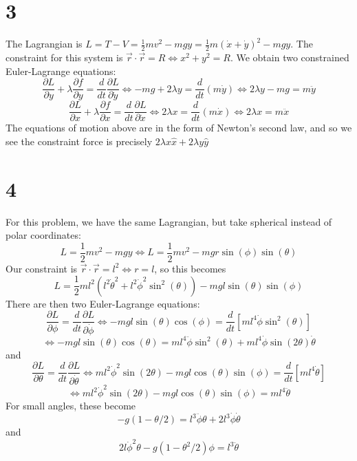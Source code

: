 \documentclass{article}
\begin{document}
\section*{3}
The Lagrangian is $L=T-V=\frac{1}{2}mv^2-mgy=\frac{1}{2}m(\dot{x}+\dot{y})^2-mgy$.
The constraint for this system is $\vec{r}\cdot\vec{r}=R\Leftrightarrow x^2+y^2=R$.
We obtain two constrained Euler-Lagrange equations:
\[\frac{\partial L}{\partial y}+\lambda\frac{\partial f}{\partial y}=\frac{d}{dt}\frac{\partial L}{\partial \dot{y}}\Leftrightarrow -mg+2\lambda y=\frac{d}{dt}(m\dot{y})\Leftrightarrow2\lambda y-mg=m\ddot{y}\]
\[\frac{\partial L}{\partial x}+\lambda\frac{\partial f}{\partial x}=\frac{d}{dt}\frac{\partial L}{\partial \dot{x}}\Leftrightarrow  2\lambda x=\frac{d}{dt}(m\dot{x})\Leftrightarrow2\lambda x=m\ddot{x}\]
The equations of motion above are in the form of Newton's second law, and so we see the constraint force is precisely $2\lambda x\hat{x}+2\lambda y\hat{y}$

\section*{4}
For this problem, we have the same Lagrangian, but take spherical instead of polar coordinates:
\[L=\frac{1}{2}mv^2-mgy \Leftrightarrow L=\frac{1}{2}mv^2-mgr\sin(\phi)\sin(\theta)\]
Our constraint is $\vec{r}\cdot\vec{r}=l^2\Leftrightarrow r=l$, so this becomes
\[L=\frac{1}{2}ml^2(l^2\dot{\theta}^2+l^2\dot{\phi}^2\sin^2(\theta))-mgl\sin(\theta)\sin(\phi)\]
There are then two Euler-Lagrange equations:
\[\frac{\partial L}{\partial \phi}=\frac{d}{dt}\frac{\partial L}{\partial \dot{\phi}}\Leftrightarrow-mgl\sin(\theta)\cos(\phi)=\frac{d}{dt}\left[ ml^4\dot{\phi}\sin^2(\theta) \right]\]
\[\Leftrightarrow -mgl\sin(\theta)\cos(\theta)=ml^4\ddot{\phi}\sin^2(\theta)+ml^4\dot{\phi}\sin(2\theta)\dot{\theta}\]
and
\[\frac{\partial L}{\partial \theta}=\frac{d}{dt}\frac{\partial L}{\partial\dot{\theta}}\Leftrightarrow ml^2\dot{\phi}^2\sin(2\theta)-mgl\cos(\theta)\sin(\phi)=\frac{d}{dt}\left[ ml^4\dot{\theta} \right]\]
\[\Leftrightarrow ml^2\dot{\phi}^2\sin(2\theta)-mgl\cos(\theta)\sin(\phi)=ml^4\ddot{\theta}\]
For small angles, these become
\[-g(1-\theta/2)=l^3\ddot{\phi}\theta+2l^3\dot{\phi}\dot{\theta}\]
and
\[2l\dot{\phi}^2\theta-g(1-\theta^2/2)\phi=l^3\ddot{\theta}\]
\end{document}
